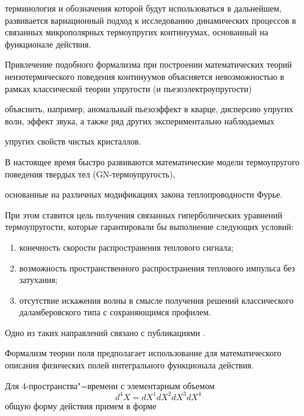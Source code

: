  терминология и обозначения которой будут использоваться в дальнейшем, развивается вариационный подход к исследованию динамических процессов в связанных микрополярных термоупругих континуумах, основанный на функционале действия.

Привлечение подобного формализма при построении математических теорий неизотермического поведения континуумов объясняется невозможностью в рамках классической теории упругости (и пьезоэлектроупругости)

объяснить, например, аномальный пьезоэффект в кварце, дисперсию упругих волн, эффект  звука\grqq{}, а также ряд других экспериментально наблюдаемых

упругих свойств чистых кристаллов.



В настоящее время быстро развиваются математические модели термоупругого поведения твердых тел (GN-термоупругость),

основанные на различных модификациях закона теплопроводности Фурье.

 При этом ставится цель получения связанных гиперболических уравнений термоупругости, которые гарантировали бы выполнение следующих условий:

\begin{enumerate}

 \item конечность скорости распространения теплового сигнала;

 \item возможность пространственного распространения теплового импульса без затухания;

 \item отсутствие искажения волны в смысле получения решений классического даламберовского типа с сохраняющимся профилем.

\end{enumerate}

 Одно из таких направлений связано с публикациями \cite{MurashkinRadayev:bib:GreenNaghdi1992, MurashkinRadayev:bib:GreenNaghdi1993}.



\smallskip




Формализм теории поля предполагает использование для математического описания физических полей интегрального функционала действия.

Для $4$-пространства"=времени с элементарным объемом  $$d^4 X=dX^1dX^2dX^3dX^4$$ общую форму действия примем в форме

